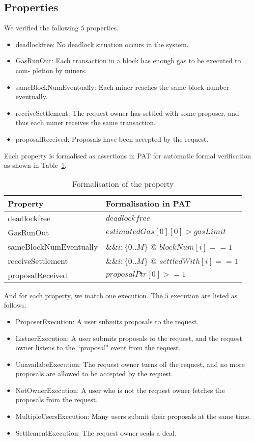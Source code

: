 \documentclass{KERauth}
\begin{document}
\subsection{Properties}
We verified the following $5$ properties.
\begin{itemize}
    \item deadlockfree: No deadlock situation occurs in the
system.
\item GasRunOut: Each transaction in a block has
enough gas to be executed to com-
pletion by miners.
\item sameBlockNumEventually: Each miner reaches the same block
number eventually.
\item receiveSettlement: The request owner has settled with
some proposer, and thus each miner
receives the same transaction.
\item proposalReceived: Proposals have been accepted by the
request.
\end{itemize}
Each property is formalised as assertions in PAT for automatic formal verification as shown in Table~\ref{tab:property}.

\begin{table}[!h]
    \centering
    \begin{tabular}{|l|l|}
    \hline
         {\bf Property} &  {\bf Formalisation in PAT}   \\
         \hline
        deadlockfree &  $deadlockfree$\\
        \hline
        GasRunOut& $estimatedGas[0][0] > gasLimit$\\
        \hline
        sameBlockNumEventually & $\&\& i:\{0..M\}$ @ $blockNum[i] == 1$\\
        \hline
        receiveSettlement & $\&\& i: \{0..M\}$ @ $settledWith[i] == 1$\\
        \hline
        proposalReceived & $proposalPtr[0] >= 1$\\
        \hline
    \end{tabular}
    \caption{Formalisation of the property}
    \label{tab:property}
\end{table}

And for each property, we match one execution.
The $5$ execution are listed as follows:
\begin{itemize}
    \item ProposerExecution: A user submits proposals to the request.
    \item ListnerExecution: A user submits proposals to the request, and the request owner listens to the ``proposal" event from the request.
\item UnavailabeExecution: The request owner turns off the request, and no more proposals are allowed to be accepted by the request.
\item NotOwnerExecution: A user who is not the request owner fetches the proposals from the request.
\item MultipleUsersExecution: Many users submit their proposals at the same time.
\item SettlementExecution: The request owner seals a deal.
\end{itemize}
\end{document}
